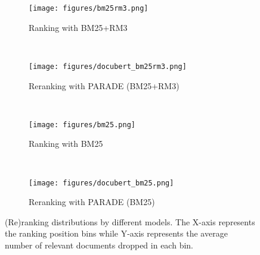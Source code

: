 \documentclass[11pt,a4paper]{article}
\begin{document}
\begin{table*}[htb]
    \centering
    \caption{(Re)ranking effectiveness of different models.}
    \label{tab.understand_reranking}
\end{table*}


\begin{figure*}[t!]
    \centering
    \begin{subfigure}[t]{0.4\textwidth}
        \centering
        \texttt{[image: figures/bm25rm3.png]}
        \caption{Ranking with BM25+RM3}
        \label{fig.understand_rm3}
    \end{subfigure}~ 
    \begin{subfigure}[t]{0.4\textwidth}
        \centering
        \texttt{[image: figures/docubert\_bm25rm3.png]}
        \caption{Reranking with PARADE (BM25+RM3)}
        \label{fig.understand_rm3_PARADE}
    \end{subfigure} ~
    \begin{subfigure}[t]{0.4\textwidth}
        \centering
        \texttt{[image: figures/bm25.png]}
        \caption{Ranking with BM25}
        \label{fig.understand_bm25}
    \end{subfigure}~ 
    \begin{subfigure}[t]{0.4\textwidth}
        \centering
        \texttt{[image: figures/docubert\_bm25.png]}
        \caption{Reranking with PARADE (BM25)}
        \label{fig.understand_bm25_PARADE}
    \end{subfigure}
    \caption{(Re)ranking distributions by different models. The X-axis represents the ranking position bins while Y-axis represents the average number of relevant documents dropped in each bin.}
    \label{fig.understand_reranking}
\end{figure*}
\end{document}
